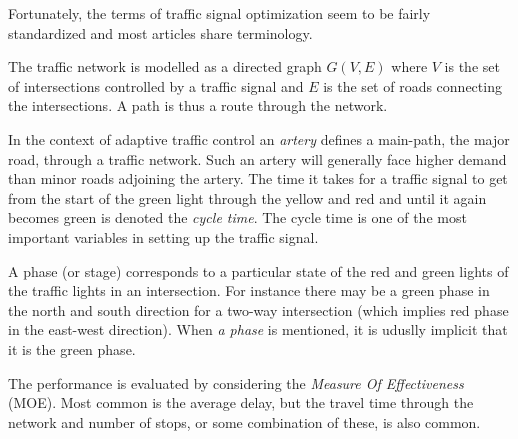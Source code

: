 \label{sec:vocabulary}

Fortunately, the terms of traffic signal optimization seem to be
fairly standardized and most articles share terminology.

The traffic network is modelled as a directed graph $G(V,E)$ where $V$
is the set of intersections controlled by a traffic signal and $E$ is
the set of roads connecting the intersections. A path is thus a route
through the network.

In the context of adaptive traffic control an {\em artery} defines a
main-path, the major road, through a traffic network. Such an artery will
generally face higher demand than minor roads adjoining the
artery. The time it takes for a traffic signal to get from the start
of the green light through the yellow and red and until it again
becomes green is denoted the {\em cycle time}. The cycle time is one
of the most important variables in setting up the traffic signal.

A phase (or stage) corresponds to a particular state of the red and
green lights of the traffic lights in an intersection. For instance
there may be a green phase in the north and south direction for a
two-way intersection (which implies red phase in the east-west
direction). When \textit{a phase} is mentioned, it is uduslly implicit
that it is the green phase.

The performance is evaluated by considering the {\em Measure Of
Effectiveness} (MOE). Most common is the average delay, but the travel
time through the network and number of stops, or some combination of
these, is also common.




